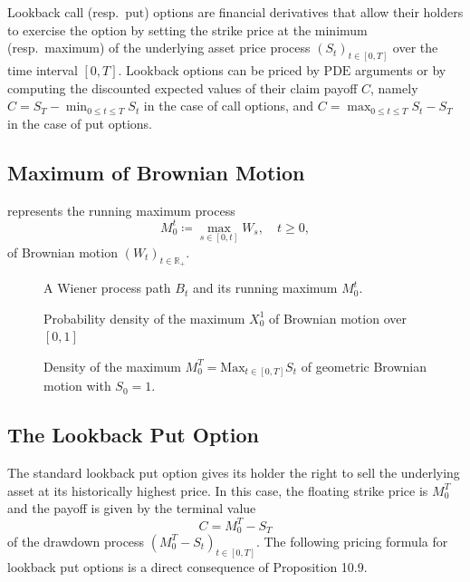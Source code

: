 Lookback call (resp.\ \(\mathrm{put}\)) options are financial derivatives that allow their holders to exercise the option by setting the strike price at the minimum (resp.\ maximum) of the underlying asset price process \((S_t)_{t \in [0,T]}\) over the time interval \([0,T]\). Lookback options can be priced by \(\mathrm{PDE}\) arguments or by computing the discounted expected values of their claim payoff \(C\), namely \(C = S_T - \min_{0 \le t \le T} S_t\) in the case of call options, and \(C = \max_{0 \le t \le T} S_t - S_T\) in the case of put options.

\subsection{Maximum of Brownian Motion}
 represents the running maximum process
\begin{equation}
	M_0^t \coloneqq \max_{s \in [0,t]} W_s, \quad t \geq 0, \nonumber
\end{equation}
of Brownian motion \((W_t)_{t\in\mathbb{R}_{+}}\).
\begin{figure}[H]
	\centering
	
	\caption{A Wiener process path \(B_t\) and its running maximum \(M_0^t\).}
	\label{fig:runningMax}
\end{figure}

\begin{figure}[H]
	\centering
	
	\caption{Probability density of the maximum \(X_0^1\) of Brownian motion over \([0,1]\)}
	\label{fig:brownianMaxDensity}
\end{figure}

\begin{figure}[H]
	\centering
	
	\caption{Density of the maximum \(M_0^T = \mathrm{Max}_{t\in[0,T]} S_t\) of geometric Brownian motion with \(S_0 = 1\).}
	\label{fig:lognormalMaximumDensity}
\end{figure}



\subsection{The Lookback Put Option}
The standard lookback put option gives its holder the right to sell the underlying asset at its historically highest price. In this case, the floating strike price is \(M_0^T\) and the payoff is given by the terminal value
\begin{equation}
	C = M_0^T - S_T
\end{equation}
of the drawdown process \((M_0^T - S_t)_{t\in[0,T]}\). The following pricing formula for lookback put options is a direct consequence of Proposition 10.9.

